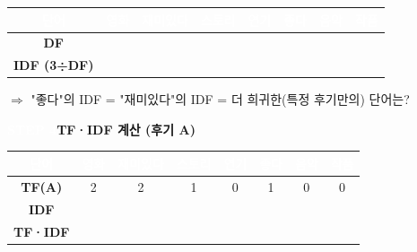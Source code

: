\documentclass[a4paper,11pt]{article}
\begin{document}
\begin{center}
\renewcommand{\arraystretch}{1.4}
\begin{tabular}{|c|c|c|c|c|c|c|c|}
\hline
\cellcolor{badgegray}\textcolor{white}{\small\bfseries 단어} & \cellcolor{badgegray}\textcolor{white}{\small\bfseries 영화} & \cellcolor{badgegray}\textcolor{white}{\small\bfseries 재미있다} & \cellcolor{badgegray}\textcolor{white}{\small\bfseries 스토리} & \cellcolor{badgegray}\textcolor{white}{\small\bfseries 연기} & \cellcolor{badgegray}\textcolor{white}{\small\bfseries 좋다} & \cellcolor{badgegray}\textcolor{white}{\small\bfseries 음악} & \cellcolor{badgegray}\textcolor{white}{\small\bfseries 작품} \\ \hline
\cellcolor{stepbg}\bfseries DF &  &  &  &  &  &  &  \\ \hline
\cellcolor{stepbg}\bfseries IDF
(3÷DF) &  &  &  &  &  &  &  \\ \hline
\end{tabular}
\end{center}
\noindent\small $\Rightarrow$ "좋다"의 IDF = \hspace{25mm}     "재미있다"의 IDF = \hspace{25mm}     더 희귀한(특정 후기만의) 단어는? \hspace{25mm}
\par
\par\vspace{3mm}
\noindent
\colorbox{badgegray}{\textcolor{white}{\small\bfseries STEP 4}}\enspace\textbf{TF·IDF 계산 (후기 A)}
\par\vspace{1mm}
\begin{center}
\renewcommand{\arraystretch}{1.4}
\begin{tabular}{|c|c|c|c|c|c|c|c|}
\hline
\cellcolor{badgegray}\textcolor{white}{\small\bfseries 단어} & \cellcolor{badgegray}\textcolor{white}{\small\bfseries 영화} & \cellcolor{badgegray}\textcolor{white}{\small\bfseries 재미있다} & \cellcolor{badgegray}\textcolor{white}{\small\bfseries 스토리} & \cellcolor{badgegray}\textcolor{white}{\small\bfseries 연기} & \cellcolor{badgegray}\textcolor{white}{\small\bfseries 좋다} & \cellcolor{badgegray}\textcolor{white}{\small\bfseries 음악} & \cellcolor{badgegray}\textcolor{white}{\small\bfseries 작품} \\ \hline
\cellcolor{stepbg}\bfseries TF(A) & \cellcolor{stepbg} 2 & \cellcolor{stepbg} 2 & \cellcolor{stepbg} 1 & \cellcolor{stepbg} 0 & \cellcolor{stepbg} 1 & \cellcolor{stepbg} 0 & \cellcolor{stepbg} 0 \\ \hline
\cellcolor{stepbg}\bfseries IDF & \cellcolor{stepbg}{\tiny\color{gray} ↑Step3} & \cellcolor{stepbg}{\tiny\color{gray} ↑} & \cellcolor{stepbg}{\tiny\color{gray} ↑} & \cellcolor{stepbg}{\tiny\color{gray} ↑} & \cellcolor{stepbg}{\tiny\color{gray} ↑} & \cellcolor{stepbg}{\tiny\color{gray} ↑} & \cellcolor{stepbg}{\tiny\color{gray} ↑} \\ \hline
\cellcolor{stepbg}\bfseries TF·IDF &  &  &  &  &  &  &  \\ \hline
\end{tabular}
\end{center}
\end{document}

